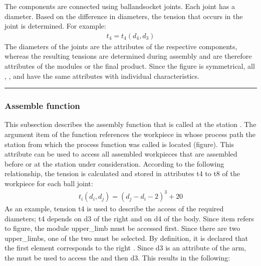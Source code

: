 \documentclass[letterpaper,10pt,english]{sphinxmanual}
\begin{document}

\sphinxAtStartPar
The components are connected using ball\sphinxhyphen{}and\sphinxhyphen{}socket joints. Each joint has a diameter. Based on the difference in
diameters, the tension that occurs in the joint is determined. For example:
\begin{equation*}
\begin{split}t_4 = t_4(d_4,d_3)\end{split}
\end{equation*}
\sphinxAtStartPar
The diameters of the joints are the attributes of the respective components, whereas the resulting tensions are
determined during assembly and are therefore attributes of the modules or the final product. Since the figure is
symmetrical, all , , and  have the same attributes with individual characteristics.



\bigskip\hrule\bigskip



\subsubsection{Assemble function}
\label{\detokenize{source/Examples/example04:assemble-function}}\label{\detokenize{source/Examples/example04:assemble-func}}
\sphinxAtStartPar
This subsection describes the assembly function that is called at the station . The argument item of
the function references the workpiece in whose process path the station from which the process function was called is
located (figure). This attribute can be used to access all assembled workpieces that are assembled before or at the
station under consideration. According to the following relationship, the tension is calculated and stored in attributes
t4 to t8 of the  workpiece for each ball joint:
\begin{equation*}
\begin{split}t_i(d_i,d_j) = (d_j - d_i - 2)^3 + 20\end{split}
\end{equation*}
\sphinxAtStartPar
As an example, tension t4 is used to describe the access of the required diameters; t4 depends on d3 of the right 
and on d4 of the body. Since item refers to figure, the module upper\_limb must be accessed first. Since there are two
upper\_limbs, one of the two must be selected. By definition, it is declared that the first element corresponds to the
right . Since d3 is an attribute of the arm, the  must be used to access the  and then d3.
This results in the following:
\end{document}
